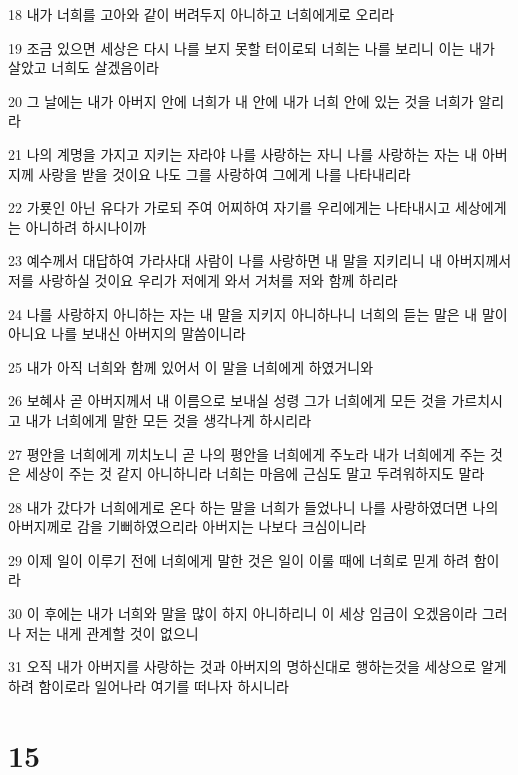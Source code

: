 \par 18 내가 너희를 고아와 같이 버려두지 아니하고 너희에게로 오리라
\par 19 조금 있으면 세상은 다시 나를 보지 못할 터이로되 너희는 나를 보리니 이는 내가 살았고 너희도 살겠음이라
\par 20 그 날에는 내가 아버지 안에 너희가 내 안에 내가 너희 안에 있는 것을 너희가 알리라
\par 21 나의 계명을 가지고 지키는 자라야 나를 사랑하는 자니 나를 사랑하는 자는 내 아버지께 사랑을 받을 것이요 나도 그를 사랑하여 그에게 나를 나타내리라
\par 22 가룟인 아닌 유다가 가로되 주여 어찌하여 자기를 우리에게는 나타내시고 세상에게는 아니하려 하시나이까
\par 23 예수께서 대답하여 가라사대 사람이 나를 사랑하면 내 말을 지키리니 내 아버지께서 저를 사랑하실 것이요 우리가 저에게 와서 거처를 저와 함께 하리라
\par 24 나를 사랑하지 아니하는 자는 내 말을 지키지 아니하나니 너희의 듣는 말은 내 말이 아니요 나를 보내신 아버지의 말씀이니라
\par 25 내가 아직 너희와 함께 있어서 이 말을 너희에게 하였거니와
\par 26 보혜사 곧 아버지께서 내 이름으로 보내실 성령 그가 너희에게 모든 것을 가르치시고 내가 너희에게 말한 모든 것을 생각나게 하시리라
\par 27 평안을 너희에게 끼치노니 곧 나의 평안을 너희에게 주노라 내가 너희에게 주는 것은 세상이 주는 것 같지 아니하니라 너희는 마음에 근심도 말고 두려워하지도 말라
\par 28 내가 갔다가 너희에게로 온다 하는 말을 너희가 들었나니 나를 사랑하였더면 나의 아버지께로 감을 기뻐하였으리라 아버지는 나보다 크심이니라
\par 29 이제 일이 이루기 전에 너희에게 말한 것은 일이 이룰 때에 너희로 믿게 하려 함이라
\par 30 이 후에는 내가 너희와 말을 많이 하지 아니하리니 이 세상 임금이 오겠음이라 그러나 저는 내게 관계할 것이 없으니
\par 31 오직 내가 아버지를 사랑하는 것과 아버지의 명하신대로 행하는것을 세상으로 알게 하려 함이로라 일어나라 여기를 떠나자 하시니라

\chapter{15}

